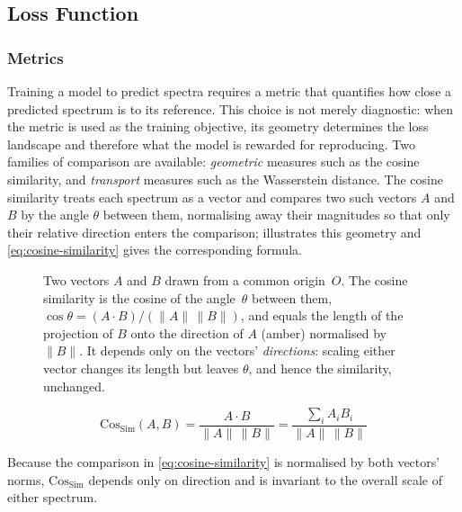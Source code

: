 \subsection{Loss Function}
\label{sec:loss-function}

\subsubsection{Metrics}

Training a model to predict spectra requires a metric that quantifies how close a predicted spectrum is to its reference. 
This choice is not merely diagnostic: when the metric is used as the training objective, its geometry determines the loss landscape and therefore what the model is rewarded for reproducing. 
Two families of comparison are available: \emph{geometric} measures such as the cosine similarity, and \emph{transport} measures such as the Wasserstein distance.
The cosine similarity treats each spectrum as a vector and compares two such vectors $A$ and $B$ by the angle $\theta$ between them, normalising away their magnitudes so that only their relative direction enters the comparison;  illustrates this geometry and \cref{eq:cosine-similarity} gives the corresponding formula.

\begin{figure}[H]
    \centering
    \resizebox{\textwidth}{!}{
        
    }
    \caption[Cosine similarity geometry]{
        Two vectors $A$ and $B$ drawn from a common
        origin~$O$. The cosine similarity is the cosine of the angle~$\theta$ between
        them, $\cos\theta = (A\cdot B)/(\|A\|\,\|B\|)$, and equals the length of the
        projection of $B$ onto the direction of $A$ (amber) normalised by $\|B\|$. It
        depends only on the vectors' \emph{directions}: scaling either vector changes its
        length but leaves $\theta$, and hence the similarity, unchanged.
    }
    \label{fig:cosine-distance-illustration}
\end{figure}
\begin{equation}
    \label{eq:cosine-similarity}
    \mathrm{Cos_{Sim}}(A,B) = \frac{A\cdot B}{\|A\|\,\|B\|} = \frac{\sum_i A_i B_i}{\|A\|\,\|B\|}
\end{equation}

Because the comparison in \cref{eq:cosine-similarity} is normalised by both vectors' norms, $\mathrm{Cos_{Sim}}$ depends only on direction and is invariant to the overall scale of either spectrum.


